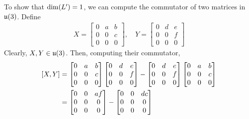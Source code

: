 \begin{boxexample}
    To show that $\dim\!\left( L' \right) = 1$, we can compute the commutator of two matrices in $\mathfrak{u}\!\left( 3 \right)$. Define
    \begin{align*}
        X = \begin{bmatrix}
            0 & a & b \\
            0 & 0 & c \\
            0 & 0 & 0
        \end{bmatrix}, \quad Y = \begin{bmatrix}
            0 & d & e \\
            0 & 0 & f \\
            0 & 0 & 0
        \end{bmatrix}
    \end{align*}
    Clearly, $X, Y \in \mathfrak{u}\!\left( 3 \right)$. Then, computing their commutator,
    \begin{align*}
        \brac{X, Y} &= \begin{bmatrix}
            0 & a & b \\
            0 & 0 & c \\
            0 & 0 & 0
        \end{bmatrix} \begin{bmatrix}
            0 & d & e \\
            0 & 0 & f \\
            0 & 0 & 0
        \end{bmatrix} - \begin{bmatrix}
            0 & d & e \\
            0 & 0 & f \\
            0 & 0 & 0
        \end{bmatrix} \begin{bmatrix}
            0 & a & b \\
            0 & 0 & c \\
            0 & 0 & 0
        \end{bmatrix} \\
        &= \begin{bmatrix}
            0 & 0 & af \\
            0 & 0 & 0 \\
            0 & 0 & 0
        \end{bmatrix} - \begin{bmatrix}
            0 & 0 & dc \\
            0 & 0 & 0 \\
            0 & 0 & 0
        \end{bmatrix} \\

\end{align*}
\end{boxexample}
